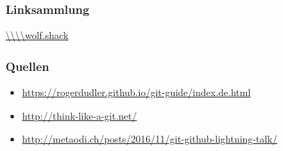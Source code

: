 \documentclass{beamer}
\begin{document}
\begin{frame}
\frametitle{Linksammlung}
\url{\\\\wolf.shack}
\end{frame}

\begin{frame}
\frametitle{Quellen}

\begin{itemize}
    \item[] \url{https://rogerdudler.github.io/git-guide/index.de.html}
    \item[] \url{http://think-like-a-git.net/}
    \item[] \url{http://metaodi.ch/posts/2016/11/git-github-lightning-talk/}
\end{itemize}


\end{frame}
\end{document}
